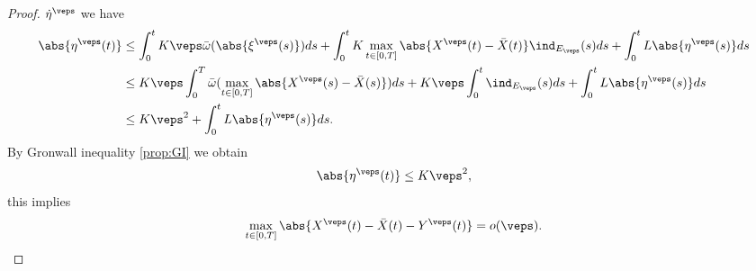 \begin{proof}
    $\Dot{\eta}^{\veps}$ we have
    \begin{align*}
        \abs{\eta^{\veps}(t)} &\leq 
            \int_{0}^{t} K\veps \Bar{\omega}(\abs{\xi^{\veps}(s)}) ds 
            + \int_{0}^{t}K \max_{t\in [0,T]} \abs{X^{\veps}(t) - \Bar{X}(t)}\ind_{E_{\veps}}(s) ds 
            + \int_{0}^{t}  L \abs{\eta ^{\veps}(s)} ds \\
        &\leq K \veps \int_{0}^{T}\Bar{\omega}(\max_{t\in [0,T]} \abs{X^{\veps}(s) - \Bar{X}(s)}) ds 
            + K\veps\int_{0}^{t}\ind_{E_{\veps}}(s) ds + \int_{0}^{t}  L \abs{\eta ^{\veps}(s)} ds \\
        &\leq K\veps^{2} + \int_{0}^{t}  L \abs{\eta ^{\veps}(s)} ds.
    \end{align*}
    By Gronwall inequality \eqref{prop:GI} we obtain
    \begin{equation*}
        \abs{\eta^{\veps}(t)} \leq K\veps^{2},
    \end{equation*}
    this implies
    \begin{equation*}
        \max_{t \in [0,T]}\abs{X^{\veps}(t) - \Bar{X}(t) - Y^{\veps}(t)} = o(\veps).
    \end{equation*}
    

\end{proof}

